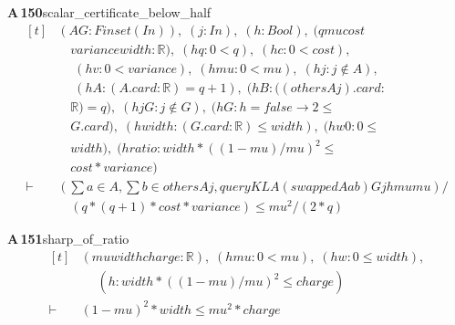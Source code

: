 \documentclass[conference]{IEEEtran}
\theoremstyle{definition}
\newcommand{\lean}[1]{\textsf{\footnotesize #1}}
\begin{document}
\noindent\textbf{A\,150}\quad\lean{scalar\_certificate\_below\_half}
{\footnotesize\[ \begin{aligned}[t]
&(\mathit{A} \mathit{G} : \mathit{Finset} (\mathit{I} \mathit{n})),\; (\mathit{j} : \mathit{I} \mathit{n}),\; (\mathit{h} : \mathit{Bool}),\; (\mathit{q} \mathit{mu} \mathit{cost}\\
&\quad \mathit{variance} \mathit{width} : \mathbb{R} ),\; (\mathit{hq} : 0<\mathit{q}),\; (\mathit{hc} : 0<\mathit{cost}),\\
&\quad \; (\mathit{hv} : 0<\mathit{variance}),\; (\mathit{hmu} : 0 < \mathit{mu}),\; (\mathit{hj} : \mathit{j} \notin \mathit{A}),\\
&\quad \; (\mathit{hA} : (\mathit{A}.\mathit{card}:\mathbb{R} )=\mathit{q}+1),\; (\mathit{hB} : ((\mathit{others} \mathit{A} \mathit{j}).\mathit{card}:\\
&\quad \mathbb{R} )=\mathit{q}),\; (\mathit{hjG} : \mathit{j} \notin \mathit{G}),\; (\mathit{hG} : \mathit{h}=\mathit{false} \to 2 \leq\\
&\quad \mathit{G}.\mathit{card}),\; (\mathit{hwidth} : (\mathit{G}.\mathit{card}:\mathbb{R} ) \leq \mathit{width}),\; (\mathit{hw0} : 0 \leq\\
&\quad \mathit{width}),\; (\mathit{hratio} : \mathit{width}*((1-\mathit{mu})/\mathit{mu})^{2} \leq\\
&\quad \mathit{cost}*\mathit{variance})\\
\vdash\;&(\textstyle\sum \mathit{a} \in \mathit{A},\textstyle\sum \mathit{b} \in \mathit{others} \mathit{A} \mathit{j},\mathit{queryKL} \mathit{A} (\mathit{swapped} \mathit{A} \mathit{a} \mathit{b}) \mathit{G} \mathit{j} \mathit{h} \mathit{mu} \mathit{mu})/\\
&\quad (\mathit{q}*(\mathit{q}+1)*\mathit{cost}*\mathit{variance}) \leq \mathit{mu}^{2}/(2*\mathit{q})
\end{aligned} \]}

\noindent\textbf{A\,151}\quad\lean{sharp\_of\_ratio}
{\footnotesize\[ \begin{aligned}[t]
&(\mathit{mu} \mathit{width} \mathit{charge} : \mathbb{R} ),\; (\mathit{hmu} : 0 < \mathit{mu}),\; (\mathit{hw} : 0 \leq \mathit{width}),\\
&\quad \; (\mathit{h} : \mathit{width}*((1-\mathit{mu})/\mathit{mu})^{2} \leq \mathit{charge})\\
\vdash\;&(1-\mathit{mu})^{2}*\mathit{width} \leq \mathit{mu}^{2}*\mathit{charge}
\end{aligned} \]}
\end{document}
